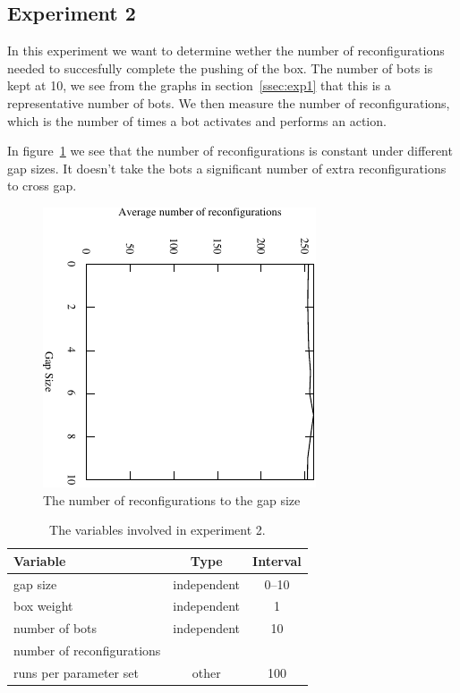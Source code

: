 \subsection{Experiment 2}
\label{ssec:exp2}

In this experiment we want to determine wether the number of reconfigurations
needed to succesfully complete the pushing of the box. The number of bots is
kept at 10, we see from the graphs in section~\ref{ssec:exp1} that this is a
representative number of bots. We then measure the number of reconfigurations,
which is the number of times a bot activates and performs an action.

In figure~\ref{fig:exp2-plot} we see that the number of reconfigurations is
constant under different gap sizes. It doesn't take the bots a significant
number of extra reconfigurations to cross gap.

\begin{figure}
\centering
\includegraphics[width=0.6\linewidth,angle=90]{results/experiment2/plot}
\caption{The number of reconfigurations to the gap size}
\label{fig:exp2-plot}
\end{figure}

\begin{table}
 \caption{The variables involved in experiment 2.}
 \begin{center}
  \begin{tabular}{| p{5cm} | c | c |}
   \hline
   \centering \textbf{Variable} & \textbf{Type} & \textbf{Interval} \\ \hline
   gap size & independent & 0--10\\ \hline
   box weight & independent & 1 \\ \hline
   number of bots & independent & 10 \\ \hline
   number of reconfigurations &  \\ \hline
   runs per parameter set & other & 100 \\ \hline
  \end{tabular}
 \end{center}
 \label{tbl:exp2}
\end{table}
